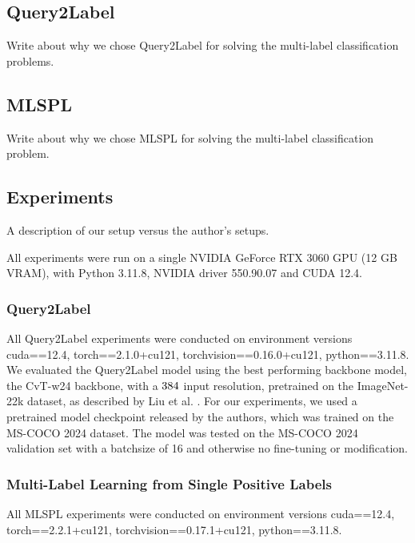 \documentclass[lettersize,journal]{IEEEtran}
\begin{document}
\subsection{Query2Label}
Write about why we chose Query2Label for solving the multi-label classification problems.

\subsection{MLSPL}
Write about why we chose MLSPL for solving the multi-label classification problem.



\subsection{Experiments}
A description of our setup versus the author's setups.

\vspace{1em}

All experiments were run on a single NVIDIA GeForce RTX 3060 GPU (12 GB VRAM), with Python 3.11.8, NVIDIA driver 550.90.07 and CUDA 12.4. 


\subsubsection{Query2Label}
All Query2Label experiments were conducted on environment versions cuda==12.4, torch==2.1.0+cu121, torchvision==0.16.0+cu121, python==3.11.8.
We evaluated the Query2Label model using the best performing backbone model, the CvT-w24 backbone, with a $384\time 384$ input resolution, pretrained on the ImageNet-22k dataset, as described by Liu et al. \cite{Query2Label}. For our experiments, we used a pretrained model checkpoint released by the authors, which was trained on the MS-COCO 2024 dataset. The model was tested on the MS-COCO 2024 validation set with a batchsize of 16 and otherwise no fine-tuning or modification.


\subsubsection{Multi-Label Learning from Single Positive Labels}
All MLSPL experiments were conducted on environment versions cuda==12.4, torch==2.2.1+cu121, torchvision==0.17.1+cu121, python==3.11.8.
\end{document}
